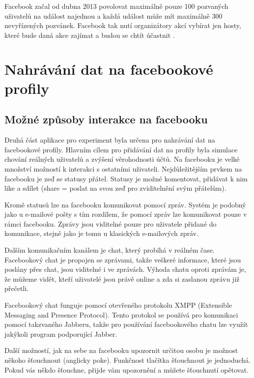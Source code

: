 \documentclass[thesis=M,czech]{FITthesis}[2013/05/10]
\begin{document}
Facebook začal od dubna 2013 povolovat maximálně pouze 100 pozvaných uživatelů na událost najednou a každá událost může mít maximálně 300 nevyřízených pozvánek. Facebook tak nutí organizátory akcí vybírat jen hosty, které bude daná akce zajímat a budou se chtít účastnit \cite{web:fbEventsLimit} \cite{web:fbEventsLimitHelpCenter}.


\section{Nahrávání dat na facebookové profily}

\subsection{Možné způsoby interakce na facebooku}

Druhá část aplikace pro experiment byla určena pro nahrávání dat na facebookové profily. Hlavním cílem pro přidávání dat na profily byla simulace chování reálných uživatelů a zvýšení věrohodnosti účtů. Na facebooku je velké množství možností k interakci s ostatními uživateli. Nejdůležitějším prvkem na facebooku je zeď se statusy přátel. Statusy je možné komentovat, přidávat k nim like a sdílet (share = poslat na svou zeď pro zviditelnění svým přátelům). 

Kromě statusů lze na facebooku komunikovat pomocí zpráv. Systém je podobný jako u e-mailové pošty s tím rozdílem, že pomocí zpráv lze komunikovat pouze  v rámci facebooku. Zprávy jsou viditelné pouze pro uživatele přidané do komunikace, stejně jako je tomu u klasických e-mailových zpráv. 

Dalším komunikačním kanálem je chat, který probíhá v reálném čase. Facebookový chat je propojen se zprávami, takže veškeré informace, které jsou poslány přes chat, jsou viditelné i ve zprávách. Výhoda chatu oproti zprávám je, že  můžeme vidět, kteří uživatelé jsou právě online a zda si zaslanou zprávu již přečetli. 

Facebookový chat funguje pomocí otevřeného protokolu XMPP (Extensible Messaging and Presence Protocol). Tento protokol se používá pro komunikaci pomocí takzvaného Jabberu, takže pro používání facebookového chatu lze využít jakýkoli program podporující Jabber.

Další možností, jak na sebe na facebooku upozornit určitou osobu je možnost někoho šťouchnout (anglicky poke). Funkčnost tlačítka šťouchnout je jednoduchá. Pokud vás někdo šťouchne, přijde vám upozornění a můžete šťouchnutí opětovat. %
\end{document}
